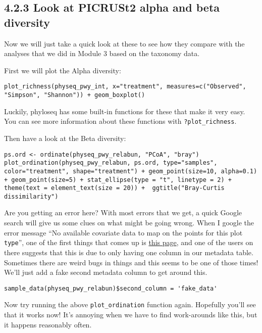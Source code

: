 \documentclass[
]{book}
\begin{document}
\subsection{4.2.3 Look at PICRUSt2 alpha and beta diversity}\label{look-at-picrust2-alpha-and-beta-diversity}

Now we will just take a quick look at these to see how they compare with the analyses that we did in Module 3 based on the taxonomy data.

First we will plot the Alpha diversity:

\begin{verbatim}
plot_richness(physeq_pwy_int, x="treatment", measures=c("Observed", "Simpson", "Shannon")) + geom_boxplot()
\end{verbatim}

Luckily, phyloseq has some built-in functions for these that make it very easy. You can see more information about these functions with \texttt{?plot\_richness}.

Then have a look at the Beta diversity:

\begin{verbatim}
ps.ord <- ordinate(physeq_pwy_relabun, "PCoA", "bray")
plot_ordination(physeq_pwy_relabun, ps.ord, type="samples", color="treatment", shape="treatment") + geom_point(size=10, alpha=0.1) + geom_point(size=5) + stat_ellipse(type = "t", linetype = 2) + theme(text = element_text(size = 20)) +  ggtitle("Bray-Curtis dissimilarity")
\end{verbatim}

Are you getting an error here? With most errors that we get, a quick Google search will give us some clues on what might be going wrong. When I google the error message ``No available covariate data to map on the points for this plot \texttt{type}'', one of the first things that comes up is \href{https://github.com/joey711/phyloseq/issues/541}{this page}, and one of the users on there suggests that this is due to only having one column in our metadata table. Sometimes there are weird bugs in things and this seems to be one of those times! We'll just add a fake second metadata column to get around this.

\begin{verbatim}
sample_data(physeq_pwy_relabun)$second_column = 'fake_data'
\end{verbatim}

Now try running the above \texttt{plot\_ordination} function again. Hopefully you'll see that it works now! It's annoying when we have to find work-arounds like this, but it happens reasonably often.
\end{document}
